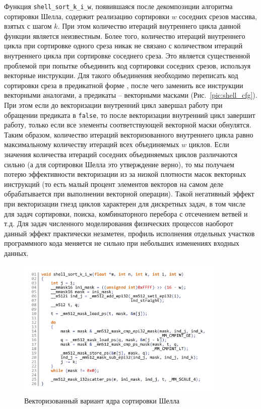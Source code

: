 \documentclass[utf8]{psta}
\begin{document}
Функция \texttt{shell\_sort\_k\_i\_w}, появившаяся после декомпозиции алгоритма сортировки Шелла, содержит реализацию сортировки $w$ соседних срезов массива, взятых с шагом $k$. 
При этом количество итераций внутреннего цикла данной функции является неизвестным. 
Более того, количество итераций внутреннего цикла при сортировке одного среза никак не связано с количеством итераций внутреннего цикла при сортировке соседнего среза. 
Это является существенной проблемой при попытке объединить код сортировки соседних срезов, используя векторные инструкции. 
Для такого объединения необходимо переписать код сортировки среза в предикатной форме \cite{Volkonskyi}, после чего заменить все инструкции векторными аналогами, а предикаты -- векторными масками (Рис.~\ref{pic:shell_cfg}). 
При этом если до векторизации внутренний цикл завершал работу при обращении предиката в \texttt{false}, то после векторизации внутренний цикл завершит работу, только если все элементы соответствующей векторной маски обнулятся. 
Таким образом, количество итераций векторизованного внутреннего цикла равно максимальному количеству итераций всех объединяемых $w$ циклов. 
Если значения количества итераций соседних объединяемых циклов различаются сильно (а для сортировки Шелла это утверждение верно), то мы получаем потерю эффективности векторизации из за низкой плотности масок векторных инструкций (то есть малый процент элементов векторов на самом деле обрабатывается при выполнении векторной операции).
Такой негативный эффект при векторизации гнезд циклов характерен для дискретных задач, в том числе для задач сортировки, поиска, комбинаторного перебора с отсечением ветвей и т.д.
Для задач численного моделирования физических процессов наоборот данный эффект практически незаметен, профиль исполнения отдельных участков программного кода меняется не сильно при небольших изменениях входных данных.

\begin{figure}
\includegraphics[width=10cm]{pics/pic_shell_code_vect}
\caption{Векторизованный вариант ядра сортировки Шелла}
\label{pic:shell_code_vect}
\end{figure}
\end{document}
